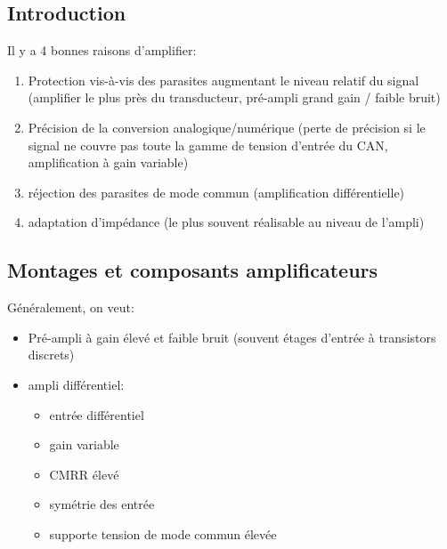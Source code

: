 \subsection{Introduction}
Il y a 4 bonnes raisons d'amplifier:
\begin{enumerate}
	\item Protection vis-à-vis des parasites augmentant le niveau relatif du signal (amplifier le plus près du transducteur, pré-ampli grand gain / faible bruit)
	\item Précision de la conversion analogique/numérique (perte de précision si le signal ne couvre pas toute la gamme de tension d'entrée du CAN, amplification à gain variable)
	\item réjection des parasites de mode commun (amplification différentielle)
	\item adaptation d'impédance (le plus souvent réalisable au niveau de l'ampli)
\end{enumerate}
\subsection{Montages et composants amplificateurs}
Généralement, on veut:
\begin{itemize}
	\item Pré-ampli à gain élevé et faible bruit (souvent étages d'entrée à transistors discrets)
	\item ampli différentiel:
	\begin{itemize}
		\item entrée différentiel
		\item gain variable
		\item CMRR élevé
		\item symétrie des entrée
		\item supporte tension de mode commun élevée
	\end{itemize}
\end{itemize}
